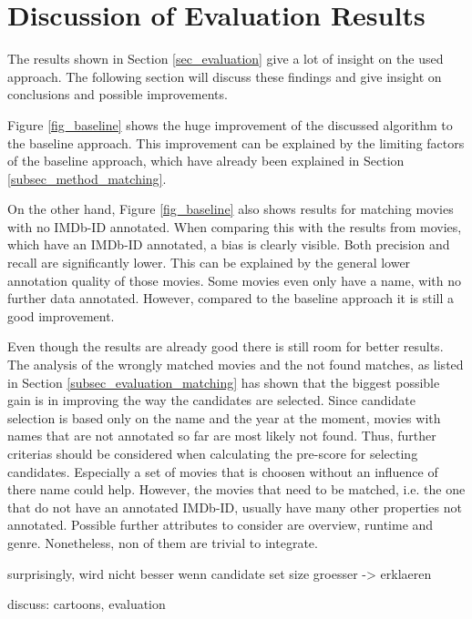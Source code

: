 \section{Discussion of Evaluation Results}
\label{sec_discussion}

The results shown in Section \ref{sec_evaluation} give a lot of insight on the used approach.
The following section will discuss these findings and give insight on conclusions and possible improvements.

Figure \ref{fig_baseline} shows the huge improvement of the discussed algorithm to the baseline approach.
This improvement can be explained by the limiting factors of the baseline approach, which have already been explained in Section \ref{subsec_method_matching}.

On the other hand, Figure \ref{fig_baseline} also shows results for matching movies with no IMDb-ID annotated.
When comparing this with the results from movies, which have an IMDb-ID annotated, a bias is clearly visible.
Both precision and recall are significantly lower.
This can be explained by the general lower annotation quality of those movies.
Some movies even only have a name, with no further data annotated.
However, compared to the baseline approach it is still a good improvement.

Even though the results are already good there is still room for better results.
The analysis of the wrongly matched movies and the not found matches, as listed in Section \ref{subsec_evaluation_matching} has shown that the biggest possible gain is in improving the way the candidates are selected.
Since candidate selection is based only on the name and the year at the moment, movies with names that are not annotated so far are most likely not found.
Thus, further criterias should be considered when calculating the pre-score for selecting candidates.
Especially a set of movies that is choosen without an influence of there name could help.
However, the movies that need to be matched, i.e. the one that do not have an annotated IMDb-ID, usually have many other properties not annotated.
Possible further attributes to consider are overview, runtime and genre.
Nonetheless, non of them are trivial to integrate.

surprisingly, wird nicht besser wenn candidate set size groesser -> erklaeren

discuss: cartoons, evaluation

